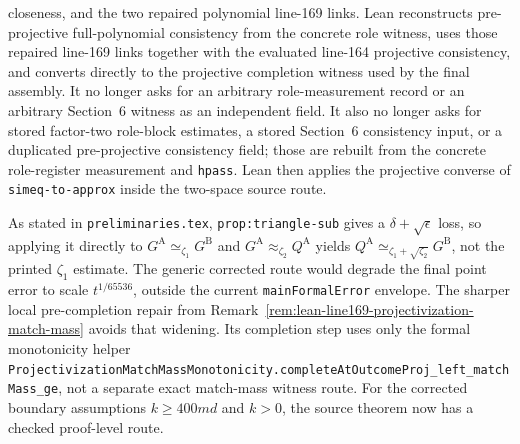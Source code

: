 \begin{remark}
closeness, and the two repaired polynomial line-169 links.  Lean reconstructs
pre-projective full-polynomial consistency from the concrete role witness, uses
those repaired line-169 links together with the evaluated line-164 projective
consistency, and converts directly to the projective completion witness used by
the final assembly.
	It no longer asks for an arbitrary role-measurement record or an arbitrary
	Section~6 witness as an independent field.  It also no longer asks for
	stored factor-two role-block estimates, a stored Section~6 consistency input,
	or a duplicated pre-projective consistency field; those are rebuilt from the
	concrete role-register measurement and \texttt{hpass}.  Lean then applies the
	projective converse of \texttt{simeq-to-approx} inside the two-space source
	route.

As stated in \texttt{preliminaries.tex}, \texttt{prop:triangle-sub} gives a
$\delta+\sqrt{\epsilon}$ loss, so applying it directly to
$G^{\mathrm A}\simeq_{\zeta_1}G^{\mathrm B}$ and
$G^{\mathrm A}\approx_{\zeta_2}Q^{\mathrm A}$ yields
	$Q^{\mathrm A}\simeq_{\zeta_1+\sqrt{\zeta_2}}G^{\mathrm B}$, not the printed
	$\zeta_1$ estimate.  The generic corrected route would degrade the final point
	error to scale $t^{1/65536}$, outside the current \texttt{mainFormalError}
	envelope.  The sharper local pre-completion repair from
	Remark~\ref{rem:lean-line169-projectivization-match-mass} avoids that
	widening.  Its completion step uses only the formal monotonicity helper
	\texttt{ProjectivizationMatchMassMonotonicity.completeAtOutcomeProj\_left\_matchMass\_ge},
	not a separate exact match-mass witness route.
	For the corrected boundary assumptions \(k \ge 400md\) and \(k>0\), the
	source theorem now has a checked proof-level route.

\end{remark}
